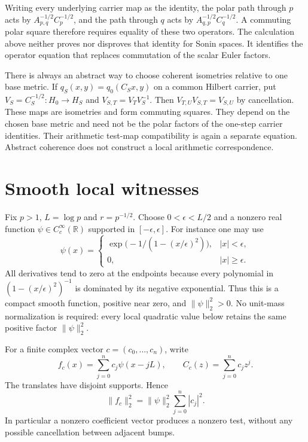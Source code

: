 \documentclass[11pt,letterpaper]{article}
\theoremstyle{definition}
\theoremstyle{remark}
\newcommand{\R}{\mathbb R}
\begin{document}
Writing every underlying carrier map as the identity, the
polar path through $p$ acts by
$A_{p,q}^{-1/2}C_p^{-1/2}$, and the path through $q$ acts by
$A_{q,p}^{-1/2}C_q^{-1/2}$. A commuting polar square therefore
requires equality of these two operators. The calculation
above neither proves nor disproves that identity for Sonin
spaces. It identifies the operator equation that replaces
commutation of the scalar Euler factors.

There is always an abstract way to choose coherent isometries
relative to one base metric. If $q_S(x,y)=q_0(C_Sx,y)$ on a
common Hilbert carrier, put $V_S=C_S^{-1/2}:H_0\to H_S$ and
$V_{S,T}=V_TV_S^{-1}$. Then
$V_{T,U}V_{S,T}=V_{S,U}$ by cancellation. These maps are
isometries and form commuting squares. They depend on the
chosen base metric and need not be the polar factors of the
one-step carrier identities. Their arithmetic test-map
compatibility is again a separate equation. Abstract coherence
does not construct a local arithmetic correspondence.

\section{Smooth local witnesses}
\label{sec:bumps}

Fix $p>1$, $L=\log p$ and $r=p^{-1/2}$. Choose
$0<\epsilon<L/2$ and a nonzero real function
$\psi\in C_c^\infty(\R)$ supported in $[-\epsilon,\epsilon]$.
For instance one may use
\begin{equation}
 \psi(x)=
 \begin{cases}
 \exp\bigl(-1/(1-(x/\epsilon)^2)\bigr),&|x|<\epsilon,\\
 0,&|x|\geq\epsilon.
 \end{cases}
 \label{eq:explicit-bump}
\end{equation}
All derivatives tend to zero at the endpoints because every
polynomial in $(1-(x/\epsilon)^2)^{-1}$ is dominated by its
negative exponential. Thus this is a compact smooth function,
positive near zero, and $\|\psi\|_2^2>0$.
No unit-mass normalization is required: every local quadratic
value below retains the same positive factor $\|\psi\|_2^2$.

For a finite complex vector $c=(c_0,\ldots,c_n)$, write
\begin{equation}
 f_c(x)=\sum_{j=0}^nc_j\psi(x-jL),\qquad
 C_c(z)=\sum_{j=0}^nc_jz^j.
 \label{eq:bump-packet}
\end{equation}
The translates have disjoint supports. Hence
\begin{equation}
 \|f_c\|_2^2=\|\psi\|_2^2\sum_{j=0}^n|c_j|^2.
 \label{eq:packet-norm}
\end{equation}
In particular a nonzero coefficient vector produces a nonzero
test, without any possible cancellation between adjacent bumps.
\end{document}
